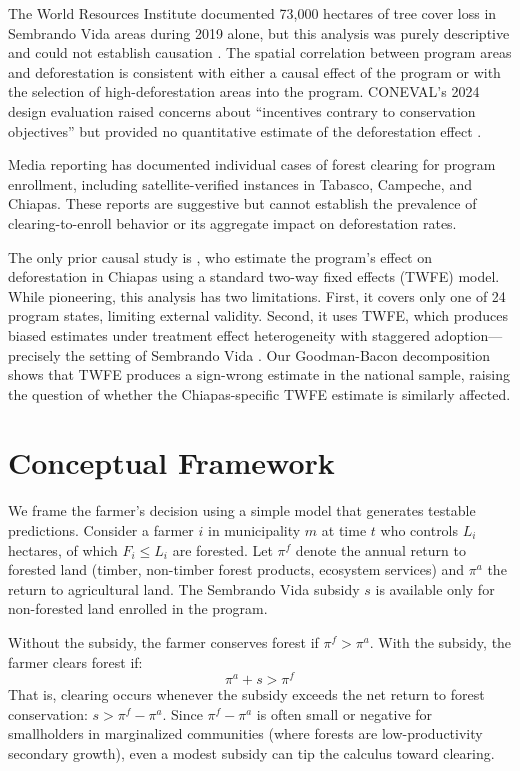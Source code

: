 \documentclass[12pt]{article}
\begin{document}
The World Resources Institute documented 73,000 hectares of tree cover loss in Sembrando Vida areas during 2019 alone, but this analysis was purely descriptive and could not establish causation \citep{wri2020sembrando}. The spatial correlation between program areas and deforestation is consistent with either a causal effect of the program or with the selection of high-deforestation areas into the program. CONEVAL's 2024 design evaluation raised concerns about ``incentives contrary to conservation objectives'' but provided no quantitative estimate of the deforestation effect \citep{coneval2024evaluacion}.

Media reporting has documented individual cases of forest clearing for program enrollment, including satellite-verified instances in Tabasco, Campeche, and Chiapas. These reports are suggestive but cannot establish the prevalence of clearing-to-enroll behavior or its aggregate impact on deforestation rates.

The only prior causal study is \citet{perezponciano2025deforestation}, who estimate the program's effect on deforestation in Chiapas using a standard two-way fixed effects (TWFE) model. While pioneering, this analysis has two limitations. First, it covers only one of 24 program states, limiting external validity. Second, it uses TWFE, which produces biased estimates under treatment effect heterogeneity with staggered adoption---precisely the setting of Sembrando Vida \citep{goodmanbacon2021difference, dechaisemartin2020two}. Our Goodman-Bacon decomposition shows that TWFE produces a sign-wrong estimate in the national sample, raising the question of whether the Chiapas-specific TWFE estimate is similarly affected.


\section{Conceptual Framework}

We frame the farmer's decision using a simple model that generates testable predictions. Consider a farmer $i$ in municipality $m$ at time $t$ who controls $L_i$ hectares, of which $F_i \leq L_i$ are forested. Let $\pi^f$ denote the annual return to forested land (timber, non-timber forest products, ecosystem services) and $\pi^a$ the return to agricultural land. The Sembrando Vida subsidy $s$ is available only for non-forested land enrolled in the program.

Without the subsidy, the farmer conserves forest if $\pi^f > \pi^a$. With the subsidy, the farmer clears forest if:
\begin{equation}
\pi^a + s > \pi^f
\end{equation}
That is, clearing occurs whenever the subsidy exceeds the net return to forest conservation: $s > \pi^f - \pi^a$. Since $\pi^f - \pi^a$ is often small or negative for smallholders in marginalized communities (where forests are low-productivity secondary growth), even a modest subsidy can tip the calculus toward clearing.
\end{document}
